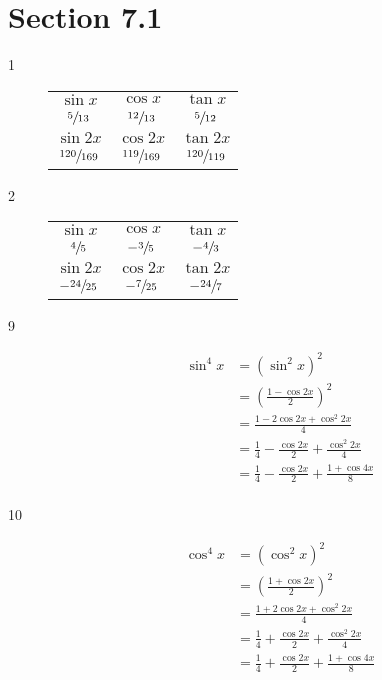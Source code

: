 \documentclass{exam}
\begin{document}
    \section{Section 7.1}
    \begin{description}

      \item[1] 
        \begin{tabular}[H]{ccc}
          \toprule
          $\sin x$           & $\cos x$           & $\tan x$      \\
          $\sfrac{5}{13}$    & $\sfrac{12}{13}$   & $\sfrac{5}{12}$ \\
          \midrule
          $\sin 2x$          & $\cos 2x$          & $\tan 2x$      \\
          $\sfrac{120}{169}$ & $\sfrac{119}{169}$ & $\sfrac{120}{119}$ \\
          \bottomrule
        \end{tabular}

      \item[2] 
        \begin{tabular}[H]{ccc}
          \toprule
          $\sin x$          & $\cos x$         & $\tan x$      \\
          $\sfrac{4}{5}$    & $- \sfrac{3}{5}$ & $-\sfrac{4}{3}$ \\
          \midrule
          $\sin 2x$         & $\cos 2x$        & $\tan 2x$      \\
          $-\sfrac{24}{25}$ & $-\sfrac{7}{25}$ & $-\sfrac{24}{7}$ \\
          \bottomrule
        \end{tabular}

      \item[9]
        \begin{align*}
          \sin^4 x & = \left( \sin^2 x \right)^2 \\
                   & = \left( \frac{1 - \cos 2x}{2} \right)^2 \\
                   & = \frac{1 - 2 \cos 2x + \cos^2 2x}{4} \\
                   &= \frac{1}{4} - \frac{\cos 2x}{2} + \frac{\cos^2 2x}{4} \\
                   &= \boxed{ \frac{1}{4} - \frac{\cos 2x}{2} + \frac{1 + \cos 4x}{8} } \\
        \end{align*}

      \item[10]
        \begin{align*}
          \cos^4 x & = \left( \cos^2 x \right)^2 \\
                   & = \left( \frac{1 + \cos 2x}{2} \right)^2 \\
                   & = \frac{1 + 2 \cos 2x + \cos^2 2x}{4} \\
                   &= \frac{1}{4} + \frac{\cos 2x}{2} + \frac{\cos^2 2x}{4} \\
                   &= \boxed{ \frac{1}{4} + \frac{\cos 2x}{2} + \frac{1 + \cos 4x}{8} } \\
        \end{align*}


\end{description}
\end{document}
